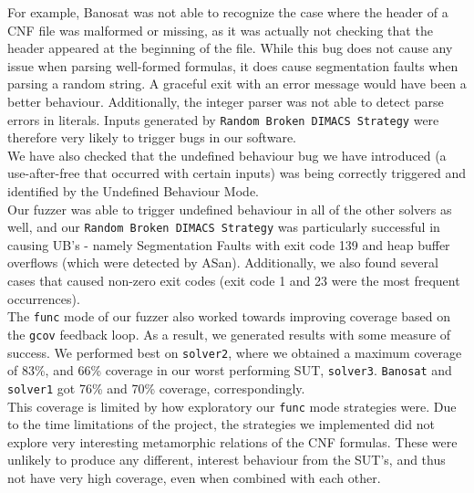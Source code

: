 \documentclass{article}
\begin{document}
For example, Banosat was not able to recognize the case where the header of a CNF file was malformed or missing,
as it was actually not checking that the header appeared at the beginning of the file. While this bug
does not cause any issue when parsing well-formed formulas, it does cause segmentation faults when parsing
a random string. A graceful exit with an error message would have been a better behaviour.
Additionally, the integer parser was not able to detect parse errors in literals. Inputs generated
by \verb|Random Broken DIMACS Strategy| were therefore very likely to trigger bugs in our software. \\

We have also checked that the undefined behaviour bug we have introduced (a use-after-free that occurred with certain
inputs) was being correctly triggered and identified by the Undefined Behaviour Mode.\\

Our fuzzer was able to trigger undefined behaviour in all of the other solvers as well, and our \texttt{Random Broken DIMACS Strategy} was particularly successful in causing UB's - namely Segmentation Faults with exit code 139 and heap buffer overflows (which were detected by ASan). Additionally, we also found several cases that caused non-zero exit codes (exit code 1 and 23 were the most frequent occurrences). \\

The \texttt{func} mode of our fuzzer also worked towards improving coverage based on the \texttt{gcov} feedback loop. As a result, we generated results with some measure of success. We performed best on \texttt{solver2}, where we obtained a maximum coverage of 83\%, and 66\% coverage in our worst performing SUT, \texttt{solver3}. \texttt{Banosat} and \texttt{solver1} got 76\% and 70\% coverage, correspondingly.\\

This coverage is limited by how exploratory our \texttt{func} mode strategies were. Due to the time limitations of the project, the strategies we implemented did not explore very interesting metamorphic relations of the CNF formulas. These were unlikely to produce any different, interest behaviour from the SUT's, and thus not have very high coverage, even when combined with each other.
\end{document}

